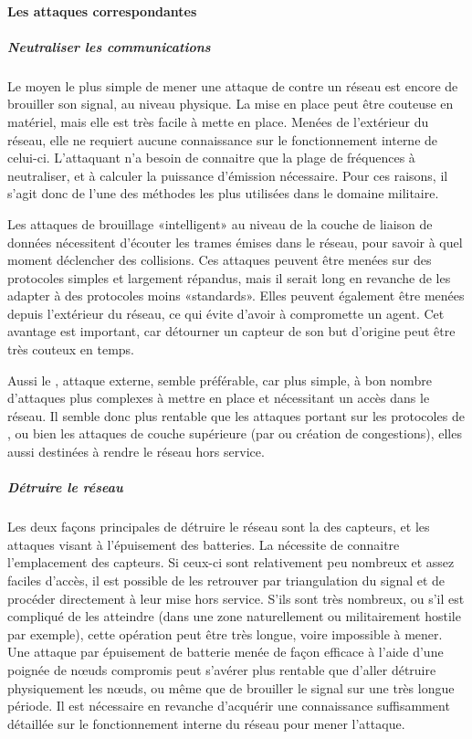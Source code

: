        \paragraph{Les attaques correspondantes}
            \subparagraph{Neutraliser les communications}
Le moyen le plus simple de mener une attaque de \dds contre un réseau est encore de brouiller son signal, au niveau physique.
La mise en place peut être couteuse en matériel, mais elle est très facile à mette en place.
Menées de l'extérieur du réseau, elle ne requiert aucune connaissance sur le fonctionnement interne de celui-ci.
L'attaquant n'a besoin de connaitre que la plage de fréquences à neutraliser, et à calculer la puissance d'émission nécessaire.
Pour ces raisons, il s'agit donc de l'une des méthodes les plus utilisées dans le domaine militaire.

Les attaques de brouillage «intelligent» au niveau de la couche de liaison de données nécessitent d'écouter les trames émises dans le réseau, pour savoir à quel moment déclencher des collisions.
Ces attaques peuvent être menées sur des protocoles simples et largement répandus, mais il serait long en revanche de les adapter à des protocoles moins «standards».
Elles peuvent également être menées depuis l'extérieur du réseau, ce qui évite d'avoir à compromette un agent.
Cet avantage est important, car détourner un capteur de son but d'origine peut être très couteux en temps.

Aussi le , attaque externe, semble préférable, car plus simple, à bon nombre d'attaques plus complexes à mettre en place et nécessitant un accès dans le réseau.
Il semble donc plus rentable que les attaques portant sur les protocoles de , ou bien les attaques de couche supérieure (par \desync ou création de congestions), elles aussi destinées à rendre le réseau hors service.

            \subparagraph{Détruire le réseau}
Les deux façons principales de détruire le réseau sont la  des capteurs, et les attaques visant à l'épuisement des batteries.
La  nécessite de connaitre l'emplacement des capteurs.
Si ceux-ci sont relativement peu nombreux et assez faciles d'accès, il est possible de les retrouver par triangulation du signal et de procéder directement à leur mise hors service.
S'ils sont très nombreux, ou s'il est compliqué de les atteindre (dans une zone naturellement ou militairement hostile par exemple), cette opération peut être très longue, voire impossible à mener.
Une attaque par épuisement de batterie menée de façon efficace à l'aide d'une poignée de nœuds compromis peut s'avérer plus rentable que d'aller détruire physiquement les nœuds, ou même que de brouiller le signal sur une très longue période.
Il est nécessaire en revanche d'acquérir une connaissance suffisamment détaillée sur le fonctionnement interne du réseau pour mener l'attaque.

